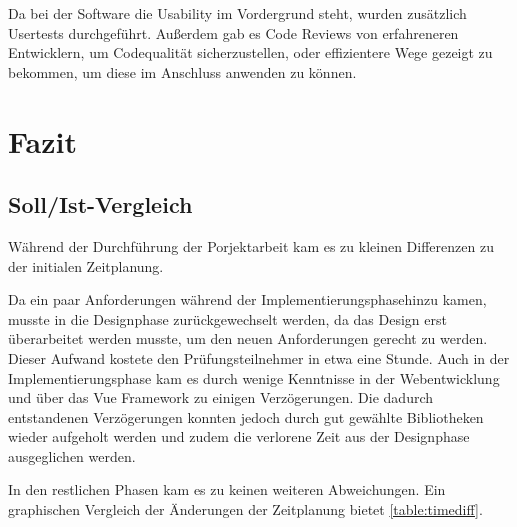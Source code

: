\documentclass[12pt]{article}
\begin{document}
Da bei der Software die Usability im Vordergrund steht, wurden zusätzlich Usertests durchgeführt.
Außerdem gab es Code Reviews von erfahreneren Entwicklern, um Codequalität sicherzustellen, oder effizientere Wege gezeigt zu bekommen,
um diese im Anschluss anwenden zu können.


%
%

\section{Fazit}



\subsection{Soll/Ist-Vergleich}

Während der Durchführung der Porjektarbeit kam es zu kleinen Differenzen zu der initialen Zeitplanung.

Da ein paar Anforderungen während der Implementierungsphasehinzu kamen, musste in die Designphase zurückgewechselt werden, da
das Design erst überarbeitet werden musste, um den neuen Anforderungen
gerecht zu werden. Dieser Aufwand kostete den Prüfungsteilnehmer in etwa eine Stunde. Auch in der Implementierungsphase
kam es durch wenige Kenntnisse in der Webentwicklung und über das Vue Framework zu einigen Verzögerungen.
Die dadurch entstandenen Verzögerungen konnten jedoch durch gut gewählte Bibliotheken wieder aufgeholt werden und
zudem die verlorene Zeit aus der Designphase ausgeglichen werden. 

In den restlichen Phasen kam es zu keinen weiteren Abweichungen.\newline
Ein graphischen Vergleich der Änderungen der Zeitplanung bietet \autoref{table:timediff}.
\end{document}
